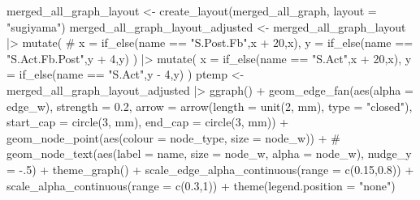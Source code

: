\documentclass[
  letterpaper,
  DIV=11,
  numbers=noendperiod]{scrartcl}
\newenvironment{Shaded}{\begin{snugshade}}{\end{snugshade}}
\newcommand{\AttributeTok}[1]{\textcolor[rgb]{0.40,0.45,0.13}{#1}}
\newcommand{\CommentTok}[1]{\textcolor[rgb]{0.37,0.37,0.37}{#1}}
\newcommand{\DecValTok}[1]{\textcolor[rgb]{0.68,0.00,0.00}{#1}}
\newcommand{\FloatTok}[1]{\textcolor[rgb]{0.68,0.00,0.00}{#1}}
\newcommand{\FunctionTok}[1]{\textcolor[rgb]{0.28,0.35,0.67}{#1}}
\newcommand{\NormalTok}[1]{\textcolor[rgb]{0.00,0.23,0.31}{#1}}
\newcommand{\OtherTok}[1]{\textcolor[rgb]{0.00,0.23,0.31}{#1}}
\newcommand{\SpecialCharTok}[1]{\textcolor[rgb]{0.37,0.37,0.37}{#1}}
\newcommand{\StringTok}[1]{\textcolor[rgb]{0.13,0.47,0.30}{#1}}
\begin{document}
\begin{Shaded}
\begin{Highlighting}[]
\NormalTok{merged\_all\_graph\_layout }\OtherTok{\textless{}{-}} \FunctionTok{create\_layout}\NormalTok{(merged\_all\_graph, }\AttributeTok{layout =} \StringTok{"sugiyama"}\NormalTok{)}
\NormalTok{merged\_all\_graph\_layout\_adjusted }\OtherTok{\textless{}{-}} 
\NormalTok{    merged\_all\_graph\_layout }\SpecialCharTok{|\textgreater{}} 
    \FunctionTok{mutate}\NormalTok{(}
        \CommentTok{\# x = if\_else(name == "S.Post.Fb",x + 20,x),}
        \AttributeTok{y =} \FunctionTok{if\_else}\NormalTok{(name }\SpecialCharTok{==} \StringTok{"S.Act.Fb.Post"}\NormalTok{,y }\SpecialCharTok{+} \DecValTok{4}\NormalTok{,y)}
\NormalTok{           ) }\SpecialCharTok{|\textgreater{}} 
    \FunctionTok{mutate}\NormalTok{(}
        \AttributeTok{x =} \FunctionTok{if\_else}\NormalTok{(name }\SpecialCharTok{==} \StringTok{"S.Act"}\NormalTok{,x }\SpecialCharTok{+} \DecValTok{20}\NormalTok{,x),}
        \AttributeTok{y =} \FunctionTok{if\_else}\NormalTok{(name }\SpecialCharTok{==} \StringTok{"S.Act"}\NormalTok{,y }\SpecialCharTok{{-}} \DecValTok{4}\NormalTok{,y)}
\NormalTok{           ) }
\NormalTok{ptemp }\OtherTok{\textless{}{-}}\NormalTok{ merged\_all\_graph\_layout\_adjusted }\SpecialCharTok{|\textgreater{}} 
    \FunctionTok{ggraph}\NormalTok{() }\SpecialCharTok{+}
        \FunctionTok{geom\_edge\_fan}\NormalTok{(}\FunctionTok{aes}\NormalTok{(}\AttributeTok{alpha =}\NormalTok{ edge\_w), }\AttributeTok{strength =} \FloatTok{0.2}\NormalTok{,}
            \AttributeTok{arrow =} \FunctionTok{arrow}\NormalTok{(}\AttributeTok{length =} \FunctionTok{unit}\NormalTok{(}\DecValTok{2}\NormalTok{, }\StringTok{\textquotesingle{}mm\textquotesingle{}}\NormalTok{), }\AttributeTok{type =} \StringTok{"closed"}\NormalTok{),}
            \AttributeTok{start\_cap =} \FunctionTok{circle}\NormalTok{(}\DecValTok{3}\NormalTok{, }\StringTok{\textquotesingle{}mm\textquotesingle{}}\NormalTok{),}
            \AttributeTok{end\_cap =} \FunctionTok{circle}\NormalTok{(}\DecValTok{3}\NormalTok{, }\StringTok{\textquotesingle{}mm\textquotesingle{}}\NormalTok{)) }\SpecialCharTok{+}
        \FunctionTok{geom\_node\_point}\NormalTok{(}\FunctionTok{aes}\NormalTok{(}\AttributeTok{colour =}\NormalTok{ node\_type, }\AttributeTok{size =}\NormalTok{ node\_w)) }\SpecialCharTok{+}
        \CommentTok{\# geom\_node\_text(aes(label = name, size = node\_w, alpha = node\_w), nudge\_y = {-}.5) +}
        \FunctionTok{theme\_graph}\NormalTok{() }\SpecialCharTok{+}
        \FunctionTok{scale\_edge\_alpha\_continuous}\NormalTok{(}\AttributeTok{range =} \FunctionTok{c}\NormalTok{(}\FloatTok{0.15}\NormalTok{,}\FloatTok{0.8}\NormalTok{)) }\SpecialCharTok{+}
        \FunctionTok{scale\_alpha\_continuous}\NormalTok{(}\AttributeTok{range =} \FunctionTok{c}\NormalTok{(}\FloatTok{0.3}\NormalTok{,}\DecValTok{1}\NormalTok{)) }\SpecialCharTok{+}
        \FunctionTok{theme}\NormalTok{(}\AttributeTok{legend.position =} \StringTok{"none"}\NormalTok{)}


\end{Highlighting}
\end{Shaded}
\end{document}

